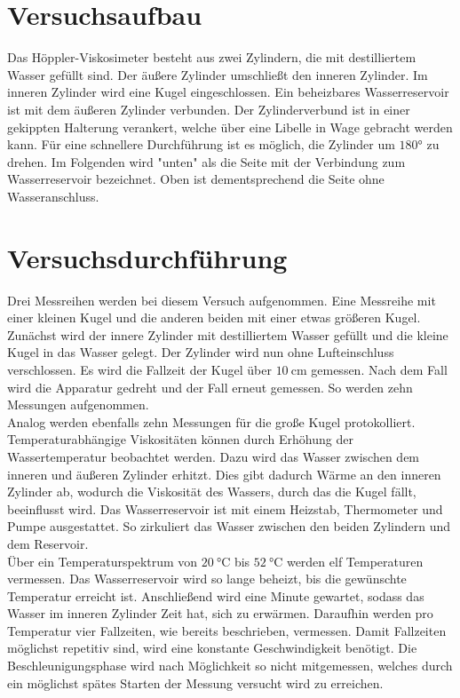 %

%
\section{Versuchsaufbau}
Das Höppler-Viskosimeter besteht aus zwei Zylindern, die mit destilliertem Wasser gefüllt sind. 
Der äußere Zylinder umschließt den inneren Zylinder. Im inneren Zylinder wird eine Kugel 
eingeschlossen. Ein beheizbares Wasserreservoir ist mit dem äußeren Zylinder verbunden. 
Der Zylinderverbund ist in einer gekippten Halterung verankert, welche über eine Libelle 
in Wage gebracht werden kann. Für eine schnellere Durchführung ist es möglich, die Zylinder um 
$\ang{180;;}$ zu drehen. Im Folgenden wird "unten" als die Seite mit der Verbindung zum Wasserreservoir 
bezeichnet. Oben ist dementsprechend die Seite ohne Wasseranschluss. 


\section{Versuchsdurchführung}
Drei Messreihen werden bei diesem Versuch aufgenommen. Eine Messreihe mit einer kleinen Kugel 
und die anderen beiden mit einer etwas größeren Kugel. Zunächst wird der innere Zylinder mit  
destilliertem Wasser gefüllt und die kleine Kugel in das Wasser gelegt. Der Zylinder wird nun 
ohne Lufteinschluss verschlossen. Es wird die Fallzeit der Kugel über $\qty{10}{\centi \meter}$
gemessen. Nach dem Fall wird die Apparatur gedreht und der Fall erneut gemessen. So werden zehn 
Messungen aufgenommen.\\
\noindent Analog werden ebenfalls zehn Messungen für die große Kugel protokolliert. \\
\noindent Temperaturabhängige Viskositäten können durch Erhöhung der Wassertemperatur beobachtet werden. 
Dazu wird das Wasser zwischen dem inneren und äußeren Zylinder erhitzt. Dies gibt dadurch Wärme 
an den inneren Zylinder ab, wodurch die Viskosität des Wassers, durch das die Kugel fällt, beeinflusst wird.
Das Wasserreservoir ist mit einem Heizstab, Thermometer und Pumpe ausgestattet. So zirkuliert das Wasser 
zwischen den beiden Zylindern und dem Reservoir.\\
Über ein Temperaturspektrum von $\qty{20}{\celsius}$ bis $\qty{52}{\celsius}$ werden elf Temperaturen vermessen. 
Das Wasserreservoir wird so lange beheizt, bis die gewünschte Temperatur erreicht ist. Anschließend wird eine 
Minute gewartet, sodass das Wasser im inneren Zylinder Zeit hat, sich zu erwärmen. Daraufhin werden pro Temperatur 
vier Fallzeiten, wie bereits beschrieben, vermessen.
Damit Fallzeiten möglichst repetitiv sind, wird eine konstante Geschwindigkeit benötigt. Die Beschleunigungsphase wird 
nach Möglichkeit so nicht mitgemessen, welches durch ein möglichst spätes Starten der Messung versucht wird zu erreichen.

